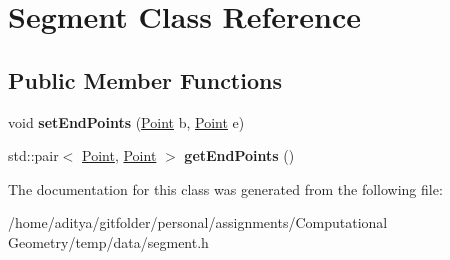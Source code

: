 \hypertarget{class_segment}{}\section{Segment Class Reference}
\label{class_segment}
\subsection*{Public Member Functions}
\begin{DoxyCompactItemize}
\item 
\hypertarget{class_segment_a937cd859986b7b9d5e2a7bcc6997a267}{}void {\bfseries set\+End\+Points} (\hyperlink{class_point}{Point} b, \hyperlink{class_point}{Point} e)\label{class_segment_a937cd859986b7b9d5e2a7bcc6997a267}

\item 
\hypertarget{class_segment_a68e181c8e454ca665f6403420530580d}{}std\+::pair$<$ \hyperlink{class_point}{Point}, \hyperlink{class_point}{Point} $>$ {\bfseries get\+End\+Points} ()\label{class_segment_a68e181c8e454ca665f6403420530580d}

\end{DoxyCompactItemize}


The documentation for this class was generated from the following file\+:\begin{DoxyCompactItemize}
\item 
/home/aditya/gitfolder/personal/assignments/\+Computational Geometry/temp/data/segment.\+h\end{DoxyCompactItemize}
